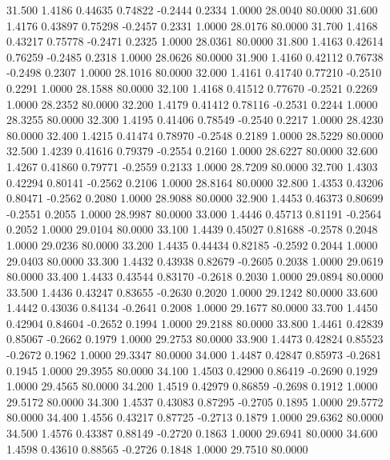   31.500   1.4186   0.44635   0.74822  -0.2444   0.2334   1.0000  28.0040  80.0000
  31.600   1.4176   0.43897   0.75298  -0.2457   0.2331   1.0000  28.0176  80.0000
  31.700   1.4168   0.43217   0.75778  -0.2471   0.2325   1.0000  28.0361  80.0000
  31.800   1.4163   0.42614   0.76259  -0.2485   0.2318   1.0000  28.0626  80.0000
  31.900   1.4160   0.42112   0.76738  -0.2498   0.2307   1.0000  28.1016  80.0000
  32.000   1.4161   0.41740   0.77210  -0.2510   0.2291   1.0000  28.1588  80.0000
  32.100   1.4168   0.41512   0.77670  -0.2521   0.2269   1.0000  28.2352  80.0000
  32.200   1.4179   0.41412   0.78116  -0.2531   0.2244   1.0000  28.3255  80.0000
  32.300   1.4195   0.41406   0.78549  -0.2540   0.2217   1.0000  28.4230  80.0000
  32.400   1.4215   0.41474   0.78970  -0.2548   0.2189   1.0000  28.5229  80.0000
  32.500   1.4239   0.41616   0.79379  -0.2554   0.2160   1.0000  28.6227  80.0000
  32.600   1.4267   0.41860   0.79771  -0.2559   0.2133   1.0000  28.7209  80.0000
  32.700   1.4303   0.42294   0.80141  -0.2562   0.2106   1.0000  28.8164  80.0000
  32.800   1.4353   0.43206   0.80471  -0.2562   0.2080   1.0000  28.9088  80.0000
  32.900   1.4453   0.46373   0.80699  -0.2551   0.2055   1.0000  28.9987  80.0000
  33.000   1.4446   0.45713   0.81191  -0.2564   0.2052   1.0000  29.0104  80.0000
  33.100   1.4439   0.45027   0.81688  -0.2578   0.2048   1.0000  29.0236  80.0000
  33.200   1.4435   0.44434   0.82185  -0.2592   0.2044   1.0000  29.0403  80.0000
  33.300   1.4432   0.43938   0.82679  -0.2605   0.2038   1.0000  29.0619  80.0000
  33.400   1.4433   0.43544   0.83170  -0.2618   0.2030   1.0000  29.0894  80.0000
  33.500   1.4436   0.43247   0.83655  -0.2630   0.2020   1.0000  29.1242  80.0000
  33.600   1.4442   0.43036   0.84134  -0.2641   0.2008   1.0000  29.1677  80.0000
  33.700   1.4450   0.42904   0.84604  -0.2652   0.1994   1.0000  29.2188  80.0000
  33.800   1.4461   0.42839   0.85067  -0.2662   0.1979   1.0000  29.2753  80.0000
  33.900   1.4473   0.42824   0.85523  -0.2672   0.1962   1.0000  29.3347  80.0000
  34.000   1.4487   0.42847   0.85973  -0.2681   0.1945   1.0000  29.3955  80.0000
  34.100   1.4503   0.42900   0.86419  -0.2690   0.1929   1.0000  29.4565  80.0000
  34.200   1.4519   0.42979   0.86859  -0.2698   0.1912   1.0000  29.5172  80.0000
  34.300   1.4537   0.43083   0.87295  -0.2705   0.1895   1.0000  29.5772  80.0000
  34.400   1.4556   0.43217   0.87725  -0.2713   0.1879   1.0000  29.6362  80.0000
  34.500   1.4576   0.43387   0.88149  -0.2720   0.1863   1.0000  29.6941  80.0000
  34.600   1.4598   0.43610   0.88565  -0.2726   0.1848   1.0000  29.7510  80.0000
